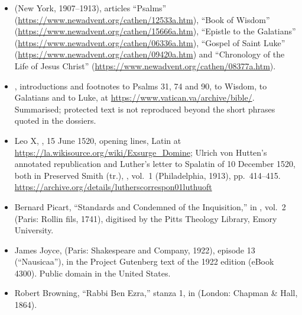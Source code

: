 \begin{itemize}[leftmargin=1.2em, itemsep=0.15em]
\item {} (New York, 1907--1913), articles
``Psalms'' (\url{https://www.newadvent.org/cathen/12533a.htm}), ``Book of
Wisdom'' (\url{https://www.newadvent.org/cathen/15666a.htm}), ``Epistle to the
Galatians'' (\url{https://www.newadvent.org/cathen/06336a.htm}), ``Gospel of
Saint Luke'' (\url{https://www.newadvent.org/cathen/09420a.htm}) and
``Chronology of the Life of Jesus Christ''
(\url{https://www.newadvent.org/cathen/08377a.htm}).
\item {}, introductions and footnotes to Psalms 31, 74
and 90, to Wisdom, to Galatians and to Luke, at
\url{https://www.vatican.va/archive/bible/}. Summarised; protected text is not
reproduced beyond the short phrases quoted in the dossiers.
\item Leo X, , 15 June 1520, opening lines, Latin at
\url{https://la.wikisource.org/wiki/Exsurge_Domine}; Ulrich von Hutten's
annotated republication and Luther's letter to Spalatin of 10 December 1520,
both in Preserved Smith (tr.), , vol.~1 (Philadelphia, 1913), pp.~414--415.
\url{https://archive.org/details/lutherscorrespon01luthuoft}
\item Bernard Picart, ``Standards and Condemned of the Inquisition,'' in
, vol.~2 (Paris: Rollin fils, 1741), digitised by
the Pitts Theology Library, Emory University.
\item James Joyce,  (Paris: Shakespeare and Company, 1922),
episode 13 (``Nausicaa''), in the Project Gutenberg text of the 1922 edition
(eBook 4300). Public domain in the United States.
\item Robert Browning, ``Rabbi Ben Ezra,'' stanza 1, in  (London: Chapman \& Hall, 1864).
\end{itemize}
